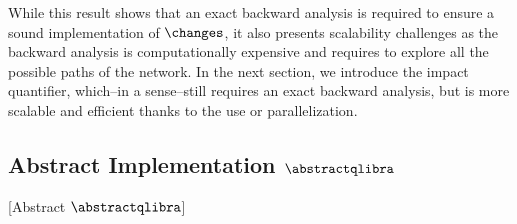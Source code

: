 While this result shows that an exact backward analysis is required to ensure a sound implementation of $\changes$, it also presents scalability challenges as the backward analysis is computationally expensive and requires to explore all the possible paths of the network.
In the next section, we introduce the \qlibraname{} impact quantifier, which--in a sense--still requires an exact backward analysis, but is more scalable and efficient thanks to the use or parallelization.

\subsection{Abstract Implementation \texorpdfstring{$\abstractqlibra$}{Abstract QLibra}}[Abstract \texorpdfstring{$\abstractqlibra$}{QLibra}]




